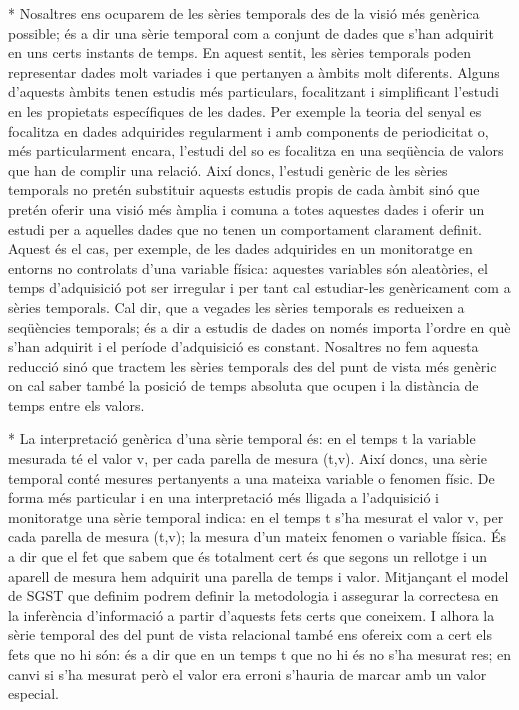 * Nosaltres ens ocuparem de les sèries temporals des de la visió més
  genèrica possible; és a dir una sèrie temporal com a conjunt de
  dades que s'han adquirit en uns certs instants de temps.  En aquest
  sentit, les sèries temporals poden representar dades molt variades i
  que pertanyen a àmbits molt diferents. Alguns d'aquests àmbits tenen
  estudis més particulars, focalitzant i simplificant l'estudi en les
  propietats específiques de les dades. Per exemple la teoria del
  senyal es focalitza en dades adquirides regularment i amb components
  de periodicitat o, més particularment encara, l'estudi del so es
  focalitza en una seqüència de valors que han de complir una relació.
  Així doncs, l'estudi genèric de les sèries temporals no pretén
  substituir aquests estudis propis de cada àmbit sinó que pretén
  oferir una visió més àmplia i comuna a totes aquestes dades i oferir
  un estudi per a aquelles dades que no tenen un comportament
  clarament definit. Aquest és el cas, per exemple, de les dades
  adquirides en un monitoratge en entorns no controlats d'una variable
  física: aquestes variables són aleatòries, el temps d'adquisició pot
  ser irregular i per tant cal estudiar-les genèricament com a sèries
  temporals.  Cal dir, que a vegades les sèries temporals es redueixen
  a seqüències temporals; és a dir a estudis de dades on només importa
  l'ordre en què s'han adquirit i el període d'adquisició es
  constant. Nosaltres no fem aquesta reducció sinó que tractem les
  sèries temporals des del punt de vista més genèric on cal saber
  també la posició de temps absoluta que ocupen i la distància de
  temps entre els valors.
  

* La interpretació genèrica d'una sèrie temporal és: en el temps t la
  variable mesurada té el valor v, per cada parella de mesura (t,v).
  Així doncs, una sèrie temporal conté mesures pertanyents a una
  mateixa variable o fenomen físic.  De forma més particular i en una
  interpretació més lligada a l'adquisició i monitoratge una sèrie
  temporal indica: en el temps t s'ha mesurat el valor v, per cada
  parella de mesura (t,v); la mesura d'un mateix fenomen o variable física. És a dir que el fet que sabem que és
  totalment cert és que segons un rellotge i un aparell de mesura hem
  adquirit una parella de temps i valor.  Mitjançant el model de SGST
  que definim podrem definir la metodologia i assegurar la correctesa
  en la inferència d'informació a partir d'aquests fets certs que
  coneixem. I alhora la sèrie temporal des del punt de vista
  relacional també ens ofereix com a cert els fets que no hi són: és a
  dir que en un temps t que no hi és no s'ha mesurat res; en canvi si
  s'ha mesurat però el valor era erroni s'hauria de marcar amb un
  valor especial.

